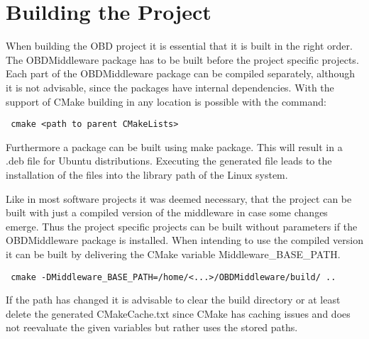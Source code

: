 \section{Building the Project}

When building the OBD project it is essential that it is built in the right order. 
The OBDMiddleware package  has to be built before the project specific projects. 
Each part of the OBDMiddleware package can be compiled separately, although it is not advisable, 
since the packages have internal dependencies. 
With the support of CMake building in any location is possible with the command:

\begin{verbatim}
 cmake <path to parent CMakeLists>
\end{verbatim}

Furthermore a package can be built using make package. This will result in a .deb file for Ubuntu distributions. 
Executing the generated file leads to the installation of the files into the library path of the Linux system. 

Like in most software projects it was deemed necessary, that the project can be built with just a compiled version 
of the middleware in case some changes emerge. Thus the project specific projects can be built without parameters 
if the OBDMiddleware package is installed. When intending to use the compiled version it can be built by delivering 
the CMake variable Middleware\_BASE\_PATH.

\begin{verbatim}
 cmake -DMiddleware_BASE_PATH=/home/<...>/OBDMiddleware/build/ .. 
\end{verbatim}

If the path has changed it is advisable to clear the build directory or at least delete the generated CMakeCache.txt 
since CMake has caching issues and does not reevaluate the given variables but rather uses the stored paths. 



